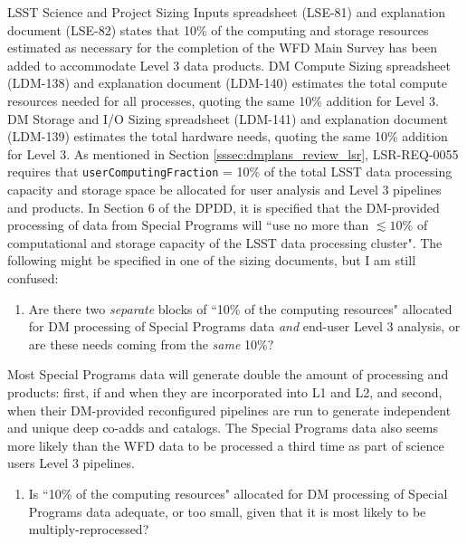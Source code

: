 \documentclass[DM,lsstdraft,toc]{lsstdoc}
\begin{document}
LSST Science and Project Sizing Inputs spreadsheet (LSE-81) and explanation document (LSE-82) states that 10\% of the computing and storage resources estimated as necessary for the completion of the WFD Main Survey has been added to accommodate Level 3 data products. DM Compute Sizing spreadsheet (LDM-138) and explanation document (LDM-140) estimates the total compute resources needed for all processes, quoting the same 10\% addition for Level 3. DM Storage and I/O Sizing spreadsheet (LDM-141) and explanation document (LDM-139) estimates the total hardware needs, quoting the same 10\% addition for Level 3. As mentioned in Section \ref{sssec:dmplans_review_lsr}, LSR-REQ-0055 requires that {\tt userComputingFraction} = 10\% of the total LSST data processing capacity and storage space be allocated for user analysis and Level 3 pipelines and products. In Section 6 of the DPDD, it is specified that the DM-provided processing of data from Special Programs will ``use no more than $\lesssim10\%$ of computational and storage capacity of the LSST data processing cluster". The following might be specified in one of the sizing documents, but I am still confused:
\begin{enumerate}[topsep=-10pt,after=\vspace{10pt},label= \textbf{Concern \Roman*.},resume] \item \label{CS-1} Are there two {\it separate} blocks of ``10\% of the computing resources" allocated for DM processing of Special Programs data {\it and} end-user Level 3 analysis, or are these needs coming from the {\it same} 10\%? \end{enumerate}

Most Special Programs data will generate double the amount of processing and products: first, if and when they are incorporated into L1 and L2, and second, when their DM-provided reconfigured pipelines are run to generate independent and unique deep co-adds and catalogs. The Special Programs data also seems more likely than the WFD data to be processed a third time as part of science users Level 3 pipelines. 
\begin{enumerate}[topsep=-10pt,after=\vspace{10pt},label= \textbf{Concern \Roman*.},resume] \item \label{CS-2} Is ``10\% of the computing resources" allocated for DM processing of Special Programs data adequate, or too small, given that it is most likely to be multiply-reprocessed? \end{enumerate}
\end{document}
